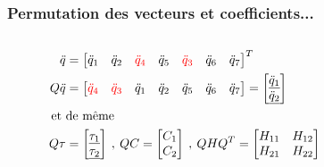 \documentclass[10pt]{beamer}
\begin{document}
\begin{frame}

  \frametitle{Permutation des vecteurs et coefficients...}
  \begin{columns}[T]
    \begin{column}{.7\textwidth}\small
	  \begin{align*}
		\ddot{q} &= 
		\begin{bmatrix}
		  \ddot{q}_1 & \ddot{q}_2 & \textcolor{red}{\ddot{q}_4} & \ddot{q}_5 & \textcolor{red}{\ddot{q}_3} & \ddot{q}_6 & \ddot{q}_7
		\end{bmatrix}^T \\
		Q \ddot{q} &= 
		\begin{bmatrix}
		  \textcolor{red}{\ddot{q}_4} & \textcolor{red}{\ddot{q}_3} & \ddot{q}_1 & \ddot{q}_2 & \ddot{q}_5 & \ddot{q}_6 & \ddot{q}_7
		\end{bmatrix}
		=
		\begin{bmatrix}
		  \underline{\ddot{q}_1} \\
		  \underline{\ddot{q}_2}
		\end{bmatrix} \\
		\textnormal{ et } &\textnormal{de même } \\
		Q \tau &= 
		\begin{bmatrix}
		  \underline{\tau_1} \\
		  \underline{\tau_2}
		\end{bmatrix}
		\: , \:
		Q C = 
		\begin{bmatrix}
		  C_1 \\
		  C_2
		\end{bmatrix}
		\: , \: Q H Q^T = 
		\begin{bmatrix}
		  H_{11} & H_{12} \\
		  H_{21} & H_{22}
		\end{bmatrix} 
		\end{align*}
  \end{column}%
  \hfill%
  \begin{column}{.3\textwidth}
  \end{column}%
  \end{columns} \pause
	

\end{frame}
\end{document}
